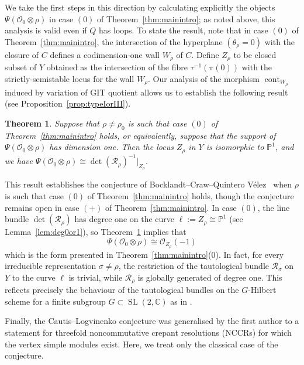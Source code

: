 \documentclass[11pt,reqno]{amsart}
\numberwithin{equation}{section}
\newtheorem{theorem}{Theorem}[section]
\theoremstyle{definition}
\newcommand{\CC}{\ensuremath{\mathbb{C}}}
\newcommand{\cont}{\operatorname{cont}}
\newcommand{\0}{\operatorname{0}}
\newcommand{\SL}{\operatorname{SL}}
\begin{document}
 
  We take the first steps in this direction by calculating explicitly the objects  $\Psi(
 \mathcal{O}_0\otimes \rho)$ in case \ensuremath{(0)} of Theorem~\ref{thm:mainintro}; as noted above, this analysis is valid even if  $Q$ has loops. To state the result, note that in case \ensuremath{(0)} of Theorem~\ref{thm:mainintro}, the intersection of the hyperplane $(\theta_\rho=0)$ with the closure of $C$ defines a codimension-one wall $W_\rho$ of $C$. Define $Z_\rho$ to be closed subset of $Y$ obtained as the intersection of the fibre $\tau^{-1}(\pi(0))$ with the strictly-semistable locus for the wall $W_\rho$. Our analysis of the morphism $\cont_{W_\rho}$ induced by variation of GIT quotient allows us to establish the following result (see Proposition~\ref{prop:typeIorIII}).

  \begin{theorem}
    \label{thm:BCQconjectureintro}
 Suppose that $\rho\neq \rho_0$ is such that case \ensuremath{(0)} of Theorem~\ref{thm:mainintro} holds, or equivalently, suppose that the support of $\Psi(\mathcal{O}_0\otimes \rho)$ has dimension one. Then the locus $Z_\rho$ in $Y$ is isomorphic to $\mathbb{P}^1$, and we have $\Psi(\mathcal{O}_0\otimes \rho)\cong \det(\mathcal{R}_\rho)^{-1}\vert_{Z_\rho}$.
 \end{theorem}
 
  This result establishes the conjecture of Bocklandt--Craw--Quintero V\'{e}lez~\cite[Conjecture~5]{BCQ21} when $\rho$ is such that case \ensuremath{(0)} of Theorem~\ref{thm:mainintro} holds, though the conjecture remains open in case \ensuremath{(+)} of Theorem~\ref{thm:mainintro}. In case \ensuremath{(0)}, the line bundle $\det(\mathcal{R}_\rho)$ has degree one on the curve $\ell:=Z_\rho\cong \mathbb{P}^1$ (see Lemma~\ref{lem:deg0or1}), so Theorem~\ref{thm:BCQconjectureintro} implies that 
  \[
  \Psi(\mathcal{O}_0\otimes \rho)\cong \mathcal{O}_{Z_\rho}(-1)
  \]
  which is the form presented in Theorem~\ref{thm:mainintro}(0). In fact, for every irreducible representation $\sigma\neq \rho$, the restriction of the tautological bundle $\mathcal{R}_\sigma$ on $Y$ to the curve $\ell$ is trivial, while $\mathcal{R}_\rho$ is globally generated of degree one. This reflects precisely the behaviour of the tautological bundles on the $G$-Hilbert scheme for a finite subgroup $G\subset \SL(2,\CC)$ as in \cite[Lemma~2.1]{KV00}.

Finally, the Cautis--Logvinenko conjecture was generalised by the first author \cite{C21} to a statement for threefold noncommutative crepant resolutions (NCCRs) for which the vertex simple modules exist. Here, we treat only the classical case of the conjecture.
 
\end{document}
